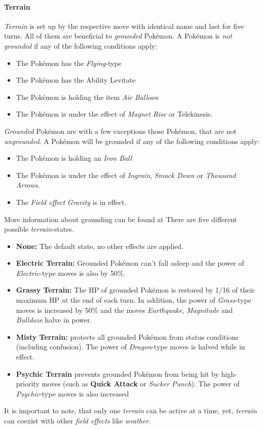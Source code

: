 \paragraph{Terrain}
\textit{Terrain} is set up by the respective move with identical name and last for five turns. 
All of them are beneficial to \textit{grounded} Pokémon. A Pokémon is \textit{not grounded} if any of the 
following conditions apply:
\begin{itemize}
	\item The Pokémon has the \textit{Flying}-type
	\item The Pokémon has the Ability Levitate
	\item The Pokémon is holding the item \textit{Air Balloon}
	\item The Pokémon is under the effect of \textit{Magnet Rise} or Telekinesis.
\end{itemize}
\textit{Grounded} Pokémon are with a few exceptions those Pokémon, that are not \textit{ungrounded}. A 
Pokémon will be grounded if any of the following conditions apply:
\begin{itemize}
	\item The Pokémon is holding an \textit{Iron Ball}
	\item The Pokémon is under the effect of \textit{Ingrain}, \textit{Smack Down} or \textit{Thousand Arrows}.
	\item The \textit{Field effect} \textit{Gravity} is in effect.
\end{itemize}
More information about grounding can be found at \cite{Bulbapedia:Grounded}
There are five different possible \textit{terrain}-states. 
\begin{itemize}
	\item \textbf{None:} The default state, no other effects are applied. 
	\item \textbf{Electric Terrain:} Grounded Pokémon can't fall asleep and the power of \textit{Electric}-type
		moves is also by 50\%.
	\item \textbf{Grassy Terrain:} The HP of grounded Pokémon is restored by 1/16 of their maximum HP at the
		end of each turn. In addition, the power of \textit{Grass}-type moves is increased by 50\% and the 
		moves \textit{Earthquake}, \textit{Magnitude} and \textit{Bulldoze} halve in power. 
	\item \textbf{Misty Terrain:} protects all grounded Pokémon from status conditions (including confusion).
		The power of \textit{Dragon}-type moves is halved while in effect. 
	\item \textbf{Psychic Terrain} prevents grounded Pokémon from being hit by high-priority moves (such as
		\textbf{Quick Attack} or \textit{Sucker Punch}). The power of \textit{Psychic}-type moves is also increased
\end{itemize}
It is important to note, that only one \textit{terrain} can be active at a time, yet, \textit{terrain}
can coexist with other \textit{field effects} like \textit{weather}.

